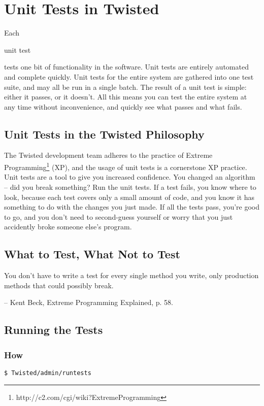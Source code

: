 \section{Unit Tests in Twisted\label{doc/howto/policy/test-standard.xhtml}}


Each \begin{em}unit test\end{em} tests one bit of functionality in the     software.  Unit tests are entirely automated and complete quickly.     Unit tests for the entire system are gathered into one test suite,     and may all be run in a single batch.  The result of a unit test     is simple: either it passes, or it doesn't.  All this means you     can test the entire system at any time without inconvenience, and     quickly see what passes and what fails.

\subsection{Unit Tests in the Twisted Philosophy}


The Twisted development team     adheres to the practice of Extreme     Programming\footnote{http://c2.com/cgi/wiki?ExtremeProgramming} (XP), and the usage of unit tests is a cornerstone     XP practice.  Unit tests are a tool to give you increased     confidence.  You changed an algorithm -- did you break something?     Run the unit tests.  If a test fails, you know where to look,     because each test covers only a small amount of code, and you know     it has something to do with the changes you just made.  If all the     tests pass, you're good to go, and you don't need to second-guess     yourself or worry that you just accidently broke someone else's     program.

\subsection{What to Test, What Not to Test}


You don't have to write a test for every single     method you write, only production methods that could possibly break.

-- Kent Beck, Extreme Programming Explained, p. 58.

\subsection{Running the Tests}


\subsubsection{How}
\begin{verbatim}
$ Twisted/admin/runtests
\end{verbatim}


